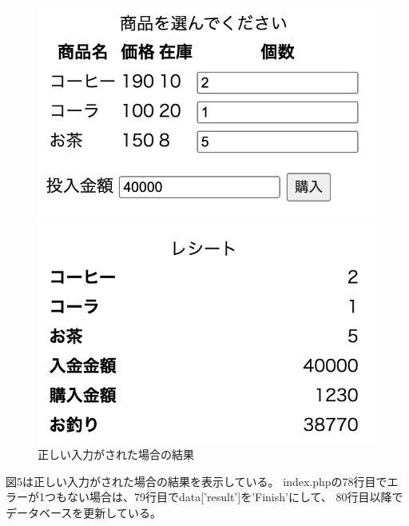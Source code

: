 \documentclass[12pt]{jarticle}
\begin{document}
\begin{figure}[h]
    \begin{minipage}{0.5\hsize}
        \begin{center}
            \includegraphics[scale=0.4]{kadai2_2_2.png}
        \end{center}
    \end{minipage}
    \begin{minipage}{0.5\hsize}
        \begin{center}
            \includegraphics[scale=0.4]{kadai2_2_3.png}
        \end{center}
    \end{minipage}
    \caption{正しい入力がされた場合の結果}
\end{figure}

図5は正しい入力がされた場合の結果を表示している。
index.phpの78行目でエラーが1つもない場合は、79行目でdata['result']を'Finish'にして、
80行目以降でデータベースを更新している。
\end{document}
